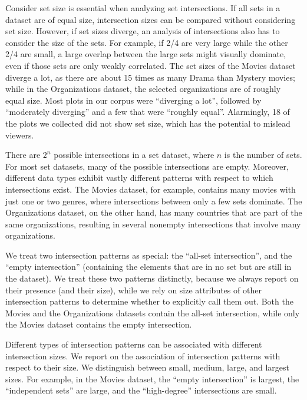 \documentclass{egpubl}
\begin{document}
\begin{description}[noitemsep, topsep=0pt]
    \item[Set Size Patterns.] Consider set size is essential when analyzing set intersections.
          If all sets in a dataset are of equal size, intersection sizes can be compared without considering set size. However, if set sizes diverge, an analysis of intersections also has to consider the size of the sets. For example, if 2/4 are very large while the other 2/4 are small, a large overlap between the large sets might visually dominate, even if those sets are only weakly correlated.
          The set sizes of the Movies dataset diverge a lot, as there are about 15 times as many Drama than Mystery movies; while in the Organizations dataset, the selected organizations are of roughly equal size.
          Most plots in our corpus were ``diverging a lot'', followed by ``moderately diverging'' and a few that were ``roughly equal''. Alarmingly, 18 of the plots we collected did not show set size, which has the potential to mislead viewers.

    \item[Intersection Patterns.]
          There are $2^n$ possible intersections in a set dataset, where $n$ is the number of sets. For most set datasets, many of the possible intersections are empty. Moreover, different data types exhibit vastly different patterns with respect to which intersections exist. The Movies dataset, for example, contains many movies with just one or two genres, where intersections between only a few sets dominate. The Organizations dataset, on the other hand, has many countries that are part of the same organizations, resulting in several nonempty intersections that involve many organizations.

    \item[Special Intersection.]
          We treat two intersection patterns as special: the ``all-set intersection'', and the ``empty intersection'' (containing the elements that are in no set but are still in the dataset). We treat these two patterns distinctly, because we always report on their presence (and their size), while we rely on size attributes of other intersection patterns to determine whether to explicitly call them out. Both the Movies and the Organizations datasets contain the all-set intersection, while only the Movies dataset contains the empty intersection.

    \item[Intersection Size Patterns.]
          Different types of intersection patterns can be associated with different intersection sizes. We report on the association of intersection patterns with respect to their size.
          We distinguish between small, medium, large, and largest sizes.
          For example, in the Movies dataset, the ``empty intersection'' is largest, the ``independent sets'' are large, and the ``high-degree'' intersections are small.


\end{description}
\end{document}
